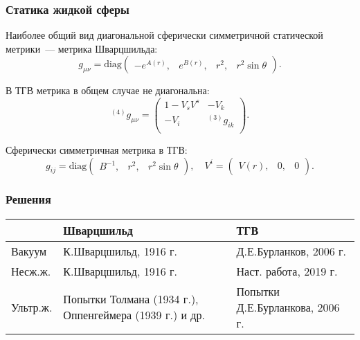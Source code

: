 \documentclass[compress]{beamer}
\begin{document}
    \begin{frame}\frametitle{Статика жидкой сферы}

        Наиболее общий вид диагональной сферически симметричной статической метрики~--- метрика Шварцшильда:
        \begin{equation*}
            g_{\mu\nu} = \text{diag} \begin{pmatrix}
                -e^{A(r)},& e^{B(r)},& r^2,& r^2 \sin\theta
            \end{pmatrix} .
        \end{equation*}

        В ТГВ метрика в общем случае не диагональна:
        \begin{equation*}
            {}^{(4)} g_{\mu\nu} = \begin{pmatrix}
                1 - V_s V^s  & -V_k   \\
                -V_i         & {}^{(3)} g_{ik} \\
            \end{pmatrix} .
        \end{equation*}

        Сферически симметричная метрика в ТГВ:
        \begin{equation*}
            g_{ij} = \text{diag} \begin{pmatrix}B^{-1}, & r^2, & r^2 \sin\theta\end{pmatrix} , \quad
            V^i = \begin{pmatrix}V(r), & 0, & 0\end{pmatrix} .
        \end{equation*}

    \end{frame}


    \begin{frame}\frametitle{Решения}

        {\footnotesize{
        \begin{tabular}{|m{4em}|m{13em}|m{13em}|}\hline
            {} & Шварцшильд & ТГВ \\\hline\hline
            Вакуум & К.Шварцшильд, 1916 г. \cite{schwarzschild_free_space_rus} & Д.Е.Бурланков, 2006 г. \cite{burlankov_space_dynamics,burlankov_new_phys} \\\hline
            Несж.ж. & К.Шварцшильд, 1916 г. \cite{schwarzschild_fluid} & Наст. работа, 2019 г. \\\hline
            Ультр.ж. & Попытки Толмана (1934 г.), Оппенгеймера (1939 г.) и др. \cite{tolman,oppenheimer_volkoff,oppenheimer_snyder} & Попытки Д.Е.Бурланкова, 2006 г. \cite{burlankov_space_dynamics,burlankov_new_phys} \\\hline
        \end{tabular}
        }}

    \end{frame}
\end{document}
